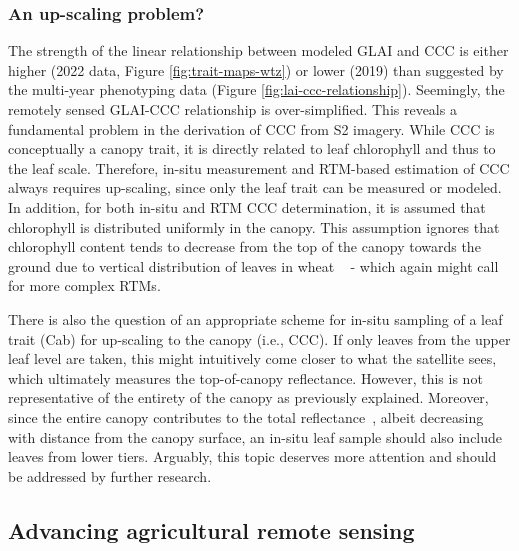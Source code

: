 \subsubsection{An up-scaling problem?}

The strength of the linear relationship between modeled \gls{GLAI} and \gls{CCC} is either higher (2022 data, Figure \ref{fig:trait-maps-wtz}) or lower (2019) than suggested by the multi-year phenotyping data (Figure \ref{fig:lai-ccc-relationship}). Seemingly, the remotely sensed GLAI-CCC relationship is over-simplified. This reveals a fundamental problem in the derivation of \gls{CCC} from \gls{S2} imagery. While \gls{CCC} is conceptually a canopy trait, it is directly related to leaf chlorophyll and thus to the leaf scale. Therefore, in-situ measurement and RTM-based estimation of \gls{CCC} always requires up-scaling, since only the leaf trait can be measured or modeled. In addition, for both in-situ and \gls{RTM} \gls{CCC} determination, it is assumed that chlorophyll is distributed uniformly in the canopy. This assumption ignores that chlorophyll content tends to decrease from the top of the canopy towards the ground due to vertical distribution of leaves in wheat ~\citep{huang_estimation_2011} - which again might call for more complex RTMs.

There is also the question of an appropriate scheme for in-situ sampling of a leaf trait (Cab) for up-scaling to the canopy (i.e., CCC). If only leaves from the upper leaf level are taken, this might intuitively come closer to what the satellite sees, which ultimately measures the top-of-canopy reflectance. However, this is not representative of the entirety of the canopy as previously explained. Moreover, since the entire canopy contributes to the total reflectance~\citep{kuusk_markov_1995, wang_canopy_2013, dodorico_vertical_2018}, albeit decreasing with distance from the canopy surface, an in-situ leaf sample should also include leaves from lower tiers. Arguably, this topic deserves more attention and should be addressed by further research.

\subsection{Advancing agricultural remote sensing}

